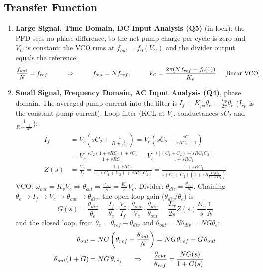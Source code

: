 \subsection{Transfer Function}
\begin{enumerate}
  \item \textbf{Large Signal, Time Domain, DC Input Analysis (Q5)} (in lock): the PFD sees no phase
    difference, so the net pump charge per cycle is zero and \(V_C\) is constant; the VCO runs at
    \(f_{out} = f_0(V_C)\) and the divider output equals the reference:
    \begin{align*}
      \frac{f_{out}}{N} &= f_{ref} \hspace{1cm} \Rightarrow \hspace{1cm} f_{out} = N f_{ref}, \hspace{1cm} V_C = \frac{2\pi (N f_{ref} - f_0(0))}{K_v} \hspace{0.5cm} [\text{linear VCO}]
    \end{align*}
  \item \textbf{Small Signal, Frequency Domain, AC Input Analysis (Q4)}, phase domain.
The averaged pump current into the filter is \(I_f = K_{pd}\theta_e = \frac{I_{cp}}{2\pi}\theta_e\)
(\(I_{cp}\) is the constant pump current).
Loop filter (KCL at \(V_c\), conductances \(sC_2\) and \(\frac{1}{R + \frac{1}{sC_1}}\)):
\begin{align*}
  I_f &= V_c\left(sC_2 + \frac{1}{R + \frac{1}{sC_1}}\right) = V_c\left(sC_2 + \frac{sC_1}{sRC_1 + 1}\right) \\
      &= V_c\,\frac{sC_2(1 + sRC_1) + sC_1}{1 + sRC_1} = V_c\,\frac{s\left[(C_1 + C_2) + sRC_1C_2\right]}{1 + sRC_1} \\
  Z(s) &= \frac{V_c}{I_f} = \frac{1 + sRC_1}{s\left[(C_1 + C_2) + sRC_1C_2\right]} = \frac{1 + sRC_1}{s(C_1 + C_2)\left(1 + sR\frac{C_1 C_2}{C_1 + C_2}\right)}
\end{align*}
VCO: \(\omega_{out} = K_v V_c \Rightarrow \theta_{out} = \frac{\omega_{out}}{s} = \frac{K_v}{s} V_c\). Divider:
\(\theta_{div} = \frac{\theta_{out}}{N}\). Chaining \(\theta_e \to I_f \to V_c \to \theta_{out} \to \theta_{div}\),
the open loop gain (\(\theta_{div}/\theta_e\)) is
\[
  G(s) = \frac{\theta_{div}}{\theta_e} = \frac{I_f}{\theta_e}\cdot\frac{V_c}{I_f}\cdot\frac{\theta_{out}}{V_c}\cdot\frac{\theta_{div}}{\theta_{out}} = \frac{I_{cp}}{2\pi} Z(s) \frac{K_v}{s} \frac{1}{N}
\]
and the closed loop, from \(\theta_e = \theta_{ref} - \theta_{div}\) and \(\theta_{out} = N\theta_{div} = N G\theta_e\):
\begin{align*}
  \theta_{out} &= N G\left(\theta_{ref} - \frac{\theta_{out}}{N}\right) = N G\,\theta_{ref} - G\,\theta_{out} \\
  \theta_{out}(1 + G) &= N G\,\theta_{ref} \hspace{0.5cm} \Rightarrow \hspace{0.5cm}
  \frac{\theta_{out}}{\theta_{ref}} = \frac{N G(s)}{1 + G(s)}
\end{align*}

\end{enumerate}

